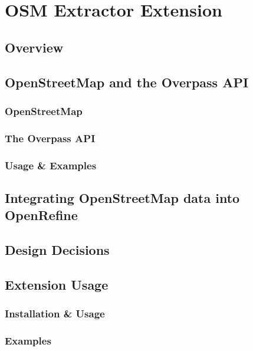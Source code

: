 \chapter{OSM Extractor Extension}
\section{Overview}
\lipsum[3-6]
\section{OpenStreetMap and the Overpass API}
\subsection{OpenStreetMap}
\lipsum[7-9]
\subsection{The Overpass API}
\lipsum[7-9]
\subsection{Usage \& Examples}
\section{Integrating OpenStreetMap data into OpenRefine}
\lipsum[13-16]
\section{Design Decisions}
\lipsum[16-17]
\section{Extension Usage}
\subsection{Installation \& Usage}
\lipsum[18-20]
\subsection{Examples}
\lipsum[1-5]